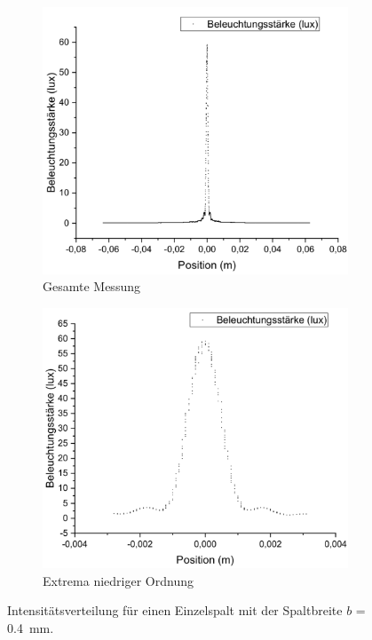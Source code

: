 \documentclass[
	a4paper,
	12pt,
	pagesize,
	ngerman
]{scrartcl}
\begin{document}
	\begin{figure}[H]
		\centering
		\begin{subfigure}{.5\textwidth}
			\centering
			\includegraphics[width=1\linewidth]{Einzelspalt0-400mm}
			\caption{Gesamte Messung}	
		\end{subfigure}%
		\begin{subfigure}{.5\textwidth}
			\centering
			\includegraphics[width=1\linewidth]{Einzelspalt0-400mmZOOM}
			\caption{Extrema niedriger Ordnung}
		\end{subfigure}
		\caption{Intensitätsverteilung für einen Einzelspalt mit der Spaltbreite $b$ = \SI{0,4}{mm}.}
		\label{Einzelspalt0-400mm}
	\end{figure}
\end{document}
